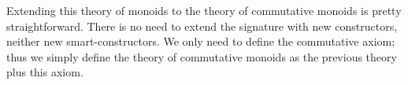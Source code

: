 \begin{code}
\>[4]\AgdaSpace{}%
\AgdaSymbol{=}\AgdaSpace{}%
\AgdaSpace{}%
\AgdaSymbol{(}\AgdaSpace{}%
\AgdaSpace{}%
\AgdaSymbol{)}\AgdaSpace{}%
\AgdaSpace{}%
\AgdaSpace{}%
\AgdaSpace{}%
\AgdaSymbol{(}\AgdaSpace{}%
\AgdaSpace{}%
\AgdaSymbol{(}\AgdaSpace{}%
\AgdaSpace{}%
\AgdaSymbol{))}\<%
\\[\AgdaEmptyExtraSkip]%
%
\>[4]\AgdaSpace{}%
\AgdaSymbol{=}\AgdaSpace{}%
\AgdaSpace{}%
\AgdaSpace{}%
\AgdaSpace{}%
\AgdaSpace{}%
\AgdaSpace{}%
\<%
\\[\AgdaEmptyExtraSkip]%
%
\>[4]\AgdaSpace{}%
\AgdaSymbol{=}\AgdaSpace{}%
\AgdaSpace{}%
\AgdaSpace{}%
\AgdaSpace{}%
\AgdaSpace{}%
\AgdaSpace{}%
\<%
\\
%
\\[\AgdaEmptyExtraSkip]%
%
\>[4]%
\>[15]\AgdaSymbol{:}\AgdaSpace{}%
\AgdaSpace{}%
\AgdaSpace{}%
\AgdaSymbol{(}\AgdaSpace{}%
\AgdaSpace{}%
\AgdaSpace{}%
\AgdaSpace{}%
\AgdaOperator{\AgdaFunction{[}}\AgdaSpace{}%
\AgdaSpace{}%
\AgdaOperator{\AgdaFunction{]}}\AgdaSymbol{)}\<%
\\
%
\>[4]\AgdaSpace{}%
\AgdaSymbol{=}\AgdaSpace{}%
\AgdaSpace{}%
\AgdaSpace{}%
\AgdaSpace{}%
\AgdaSpace{}%
\AgdaSpace{}%
\AgdaSpace{}%
\<%
\end{code}

\noindent
Extending this theory of monoids to the theory of commutative monoids
is pretty straightforward. There is no need to extend the signature
with new constructors, neither new smart-constructors. We only need to
define the commutative axiom; thus we simply define the theory of
commutative monoids as the previous theory plus this axiom.

